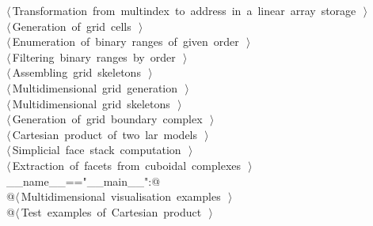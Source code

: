 \documentclass[11pt,oneside]{article}	%
\begin{document}
\begin{flushleft}
\begin{list}{}{}
\mbox{}\verb@@\hbox{$\langle\,$Transformation from multindex to address in a linear array storage\nobreak\ {\footnotesize {}}$\,\rangle$}\verb@@\\
\mbox{}\verb@@\hbox{$\langle\,$Generation of grid cells\nobreak\ {\footnotesize {}}$\,\rangle$}\verb@@\\
\mbox{}\verb@@\hbox{$\langle\,$Enumeration of binary ranges of given order\nobreak\ {\footnotesize {}}$\,\rangle$}\verb@@\\
\mbox{}\verb@@\hbox{$\langle\,$Filtering binary ranges by order\nobreak\ {\footnotesize {}}$\,\rangle$}\verb@@\\
\mbox{}\verb@@\hbox{$\langle\,$Assembling grid skeletons\nobreak\ {\footnotesize {}}$\,\rangle$}\verb@@\\
\mbox{}\verb@@\hbox{$\langle\,$Multidimensional grid generation\nobreak\ {\footnotesize {}}$\,\rangle$}\verb@@\\
\mbox{}\verb@@\hbox{$\langle\,$Multidimensional grid skeletons\nobreak\ {\footnotesize {}}$\,\rangle$}\verb@@\\
\mbox{}\verb@@\hbox{$\langle\,$Generation of grid boundary complex\nobreak\ {\footnotesize {}}$\,\rangle$}\verb@@\\
\mbox{}\verb@@\hbox{$\langle\,$Cartesian product of two lar models\nobreak\ {\footnotesize {}}$\,\rangle$}\verb@@\\
\mbox{}\verb@@\hbox{$\langle\,$Simplicial face stack computation\nobreak\ {\footnotesize {}}$\,\rangle$}\verb@@\\
\mbox{}\verb@@\hbox{$\langle\,$Extraction of facets from cuboidal complexes\nobreak\ {\footnotesize {}}$\,\rangle$}\verb@@\\
\mbox{}\verb@if __name__=="__main__":@\\
\mbox{}\verb@   @\hbox{$\langle\,$Multidimensional visualisation examples\nobreak\ {\footnotesize {}}$\,\rangle$}\verb@@\\
\mbox{}\verb@   @\hbox{$\langle\,$Test examples of Cartesian product\nobreak\ {\footnotesize {}}$\,\rangle$}\verb@@\\
\mbox{}\verb@@{\NWsep}
\end{list}
\vspace{-2ex}
\end{flushleft}
\end{document}
